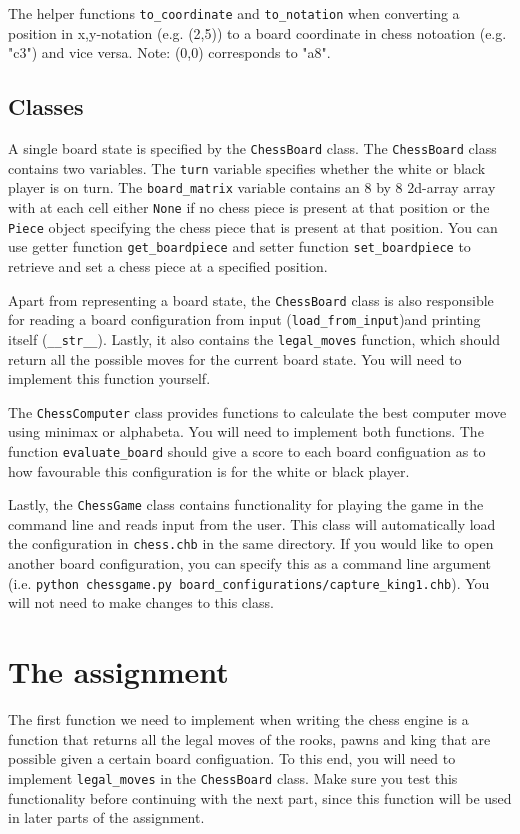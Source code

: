\documentclass{article}
\begin{document}
The helper functions \texttt{to\_coordinate} and \texttt{to\_notation} when converting a position in x,y-notation (e.g. (2,5)) to a board coordinate in chess notoation (e.g. "c3") and vice versa. Note: (0,0) corresponds to "a8".

\subsection*{Classes}
A single board state is specified by the \texttt{ChessBoard} class. The \texttt{ChessBoard} class contains two variables. The \texttt{turn} variable specifies whether the white or black player is on turn. The \texttt{board\_matrix} variable contains an 8 by 8 2d-array array with at each cell either \texttt{None} if no chess piece is present at that position or the \texttt{Piece} object specifying the chess piece that is present at that position. You can use getter function \texttt{get\_boardpiece} and setter function \texttt{set\_boardpiece} to retrieve and set a chess piece at a specified position.

Apart from representing a board state, the \texttt{ChessBoard} class is also responsible for reading a board configuration from input (\texttt{load\_from\_input})and printing itself (\texttt{\_\_str\_\_}). Lastly, it also contains the \texttt{legal\_moves} function, which should return all the possible moves for the current board state. You will need to implement this function yourself.

The \texttt{ChessComputer} class provides functions to calculate the best computer move using minimax or alphabeta. You will need to implement both functions. The function \texttt{evaluate\_board} should give a score to each board configuation as to how favourable this configuration is for the white or black player.

Lastly, the \texttt{ChessGame} class contains functionality for playing the game in the command line and reads input from the user. This class will automatically load the configuration in \texttt{chess.chb} in the same directory. If you would like to open another board configuration, you can specify this as a command line argument (i.e. \texttt{python chessgame.py board\_configurations/capture\_king1.chb}). You will not need to make changes to this class.


\section*{The assignment}
The first function we need to implement when writing the chess engine is a function that returns all the legal moves of the rooks, pawns and king that are possible given a certain board configuation. To this end, you will need to implement \texttt{legal\_moves} in the \texttt{ChessBoard} class. Make sure you test this functionality before continuing with the next part, since this function will be used in later parts of the assignment.
\end{document}
